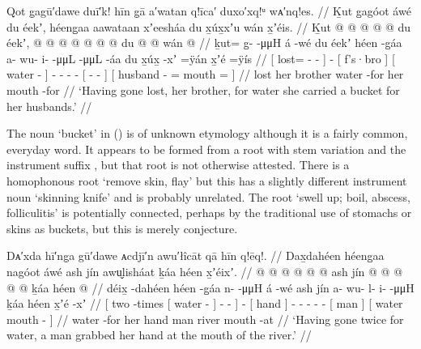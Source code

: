 \ex\label{ex:89-98-bro-lost-she-carry-water}%
%
\begingl
	\glpreamble	Qot g̣agū′dawe duī′k! hīn g̣ā a′watan q!īca′ duxo′xq!ᵘ wᴀ′nq!es. //
	\glpreamble	Ḵut g̱agóot áwé du éekʼ, héeng̱aa aawataan xʼeesháa du x̱úx̱xʼu wán x̱ʼéis. //
	\gla	{} Ḵut @  @ {} @ {} @ {} {}
		 @ {}
		{} du éekʼ, {}
		{}  @ {} {}
		 @ {} @ {} @ {} @ {}
		{}  @ {} @ {} {}
		{} du  @ {} @ \•wán  @ {} {} //
	\glb	{} ḵut= g̱-  -μμH {} {}
		á -wé
		{} du éekʼ {}
		{} héen -g̱áa {}
		a- wu- i-  -μμL
		{}  -μμL -áa {}
		{} du x̱úx̱ -xʼ =ÿán x̱ʼé =ÿís {} //
	\glc	{}[ lost= -  - \· {}]
		 -
		{}[  f’s·bro {}]
		{}[ water - {}]
		- - -  -
		{}[  - - {}]
		{}[  husband - = mouth = {}] //
	\gld	{} lost\•  {} {} {} {}
		 {}
		{} her brother {}
		{} water -for {}
		 {} {} {} {}
		{}  {} {} {}
		{} her  {} {} mouth -for {} //
	\glft	‘Having gone lost, her brother, for water she carried a bucket for her husbands.’
		//
\endgl
\xe

The noun  ‘bucket’ in (\lastx) is of unknown etymology although it is a fairly common, everyday word.
It appears to be formed from a root  with  stem variation and the instrument suffix , but that root is not otherwise attested.
There is a homophonous root  ‘remove skin, flay’ but this has a slightly different instrument noun  ‘skinning knife’ and is probably unrelated.
The root  ‘swell up; boil, abscess, folliculitis’ is potentially connected, perhaps by the traditional use of stomachs or skins as buckets, but this is merely conjecture.

\ex\label{ex:89-99-twice-man-grabs-hand}%
%
\begingl
	\glpreamble	Dᴀ′xda hī′ng̣a gū′dawe ᴀcdjī′n awu′łîcāt qā hīn q!ēq!. //
	\glpreamble	Dax̱dahéen héeng̱aa nagóot áwé ash jín awu̬lisháat ḵáa héen x̱ʼéixʼ. //
	\gla	{}  @ {} {}  @ {} {}
			 @ {} @ {} @ {} {}
		 @ {}
		{} ash jín {}
		 @ {} @ {} @ {} @ {} @ {} 
		{} ḵáa {}
		{} héen  @ {} {} //
	\glb	{} déix̱ -dahéen {} héen -g̱áa {}
			n-  -μμH {} {}
		á -wé
		{} ash jín {}
		a- wu- l- i-  -μμH
		{} ḵáa {}
		{} héen x̱ʼé -xʼ {} //
	\glc	{}[ two -times {}[ water - {}]
			-  - \· {}]
		 -
		{}[  hand {}]
		- - - -  -
		{}[ man {}]
		{}[ water mouth - {}] //
	\gld	{}  {} {} water -for {}
			 {} {} {} {}
		 {}
		{} her hand {}
		 {} {} {} {} {}
		{} man {}
		{} river mouth -at {} //
	\glft	‘Having gone twice for water, a man grabbed her hand at the mouth of the river.’
		//
\endgl
\xe

